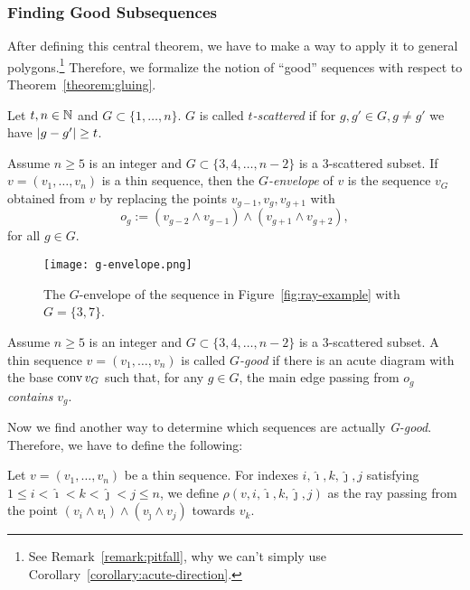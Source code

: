 \subsubsection{Finding Good Subsequences}

After defining this central theorem, we have to make a way to apply it to general polygons.\footnote{See Remark~\ref{remark:pitfall}, why we can't simply use Corollary~\ref{corollary:acute-direction}.}
Therefore, we formalize the notion of ``good'' sequences with respect to Theorem~\ref{theorem:gluing}.

\begin{definition}
  Let $t, n \in \mathbb{N}$ and $G \subset \{1,\dots,n\}$. $G$ is called $t$\emph{-scattered} if for $g, g' \in G, g \neq g'$ we have $\lvert g-g'\rvert \geq t$.
\end{definition}

\begin{definition}[G-envelope]\label{definition:g-envelope}
  Assume $n\geq 5$ is an integer and $G\subset\{3,4,\dots,n-2\}$ is a $3$-scattered subset. If $v=(v_1,\dots,v_n)$ is a thin sequence, then the $G$\emph{-envelope} of $v$ is the sequence $v_G$ obtained from $v$ by replacing the points $v_{g-1}, v_g, v_{g+1}$ with $$o_g:=(v_{g-2}\wedge v_{g-1})\wedge (v_{g+1}\wedge v_{g+2}),$$ for all $g\in G$.
\end{definition}

\begin{figure}[ht]
  \centering
  \texttt{[image: g-envelope.png]}
  \caption{The $G$-envelope of the sequence in Figure~\ref{fig:ray-example} with $G=\{3,7\}$. \cite[Figure~6]{shitov2020sublinear}}
  \label{fig:g-envelope}
\end{figure}

\begin{definition}[G-good]
  Assume $n\geq 5$ is an integer and $G\subset\{3,4,\dots,n-2\}$ is a $3$-scattered subset. A thin sequence $v=(v_1,\dots,v_n)$ is called $G$\emph{-good} if there is an acute diagram with the base $\operatorname{conv} v_G$ such that, for any $g\in G$, the main edge passing from $o_g$ \emph{contains} $v_g$.
\end{definition}

Now we find another way to determine which sequences are actually \emph{G-good}. Therefore, we have to define the following:

\begin{definition}
  Let $v=(v_1,\dots,v_n)$ be a thin sequence. For indexes $i,\hat{\imath},k, \hat{\jmath}, j$ satisfying $1\leq i<\hat{\imath}<k<\hat{\jmath}<j\leq n$, we define $\rho(v,i,\hat{\imath},k, \hat{\jmath}, j)$ as the ray passing from the point $(v_i\wedge v_{\hat{\imath}})\wedge(v_{\hat{\jmath}}\wedge v_j)$ towards $v_k$.
\end{definition}


